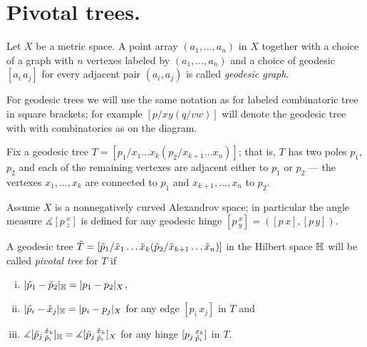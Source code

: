 \section{Pivotal trees.}

Let $X$ be a metric space.
A point array $(a_1,\dots,a_n)$ in $X$ together with a choice of a graph with $n$ vertexes labeled by  $(a_1,\dots,a_n)$ and a choice of geodesic $[a_i\,a_j]$ for every adjacent pair $(a_i,a_j)$ is called \emph{geodesic graph}.

\begin{wrapfigure}{r}{27 mm}
\vskip-2mm
\end{wrapfigure}

For geodesic trees we will use the same notation as for labeled combinatoric tree in square brackets; for example $[p/xy(q/vw)]$ will denote the geodesic tree with with combinatorics as on the diagram. 

Fix a geodesic tree $T=[p_1/x_1\dots x_k(p_2/x_{k+1}\dots x_n)]$;
that is, $T$ has two poles $p_1$, $p_2$ and each of the remaining vertexes are adjacent either to $p_1$ or $p_2$ --- the vertexes $x_1,\dots, x_k$ are connected to $p_1$ and $x_{k+1},\dots, x_n$ to $p_2$.

Assume $X$ is a nonnegatively curved Alexandrov space;
in particular the angle measure $\measuredangle[p\,^x_z]$ is defined for any geodesic hinge $[p\,^x_y]=([p\,x],[p\,y])$. 

A geodesic tree  $\~T=[\~p_1/\~x_1\dots \~x_k(\~p_2/\~x_{k+1}\dots \~x_n)]$ in the Hilbert space $\HH$ will be called \emph{pivotal tree} for $T$
if 
\begin{enumerate}[(i)]
\item $|\~p_1-\~p_2|_\HH= |p_1-p_2|_X$,
\item $|\~p_i-\~x_j|_\HH= |p_i-p_j|_X$ for any edge $[p_i\,x_j]$ in $T$ and
\item $\measuredangle[\~p_j\,^{\~x_k}_{\~p_i}]_{\HH}=\measuredangle[\~p_j\,^{\~x_k}_{\~p_i}]_X$
for any hinge  $[p_j\,^{x_k}_{\~p_i}]$ in $T$.
\end{enumerate}


